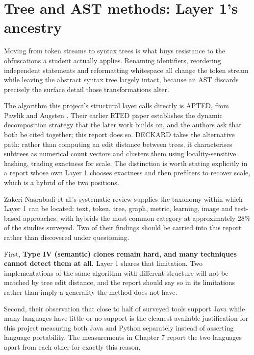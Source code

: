\hypertarget{tree-and-ast-methods-layer-1s-ancestry}{%
\section{Tree and AST methods: Layer 1's
ancestry}\label{tree-and-ast-methods-layer-1s-ancestry}}

Moving from token streams to syntax trees is what buys resistance to the
obfuscations a student actually applies. Renaming identifiers,
reordering independent statements and reformatting whitespace all change
the token stream while leaving the abstract syntax tree largely intact,
because an AST discards precisely the surface detail those
transformations alter.

The algorithm this project's structural layer calls directly is APTED,
from Pawlik and Augsten \cite{pawlik2016}. Their earlier RTED paper
\cite{pawlik2015} establishes the dynamic decomposition strategy that
the later work builds on, and the authors ask that both be cited
together; this report does so. DECKARD \cite{jiang2007} takes the
alternative path: rather than computing an edit distance between trees,
it characterises subtrees as numerical count vectors and clusters them
using locality-sensitive hashing, trading exactness for scale. The
distinction is worth stating explicitly in a report whose own Layer 1
chooses exactness and then prefilters to recover scale, which is a
hybrid of the two positions.

Zakeri-Nasrabadi et al.'s systematic review \cite{zakeri2023} supplies
the taxonomy within which Layer 1 can be located: text, token, tree,
graph, metric, learning, image and test-based approaches, with hybrids
the most common category at approximately 28\% of the studies surveyed.
Two of their findings should be carried into this report rather than
discovered under questioning.

First, \textbf{Type IV (semantic) clones remain hard, and many
techniques cannot detect them at all.} Layer 1 shares that limitation.
Two implementations of the same algorithm with different structure will
not be matched by tree edit distance, and the report should say so in
its limitations rather than imply a generality the method does not have.

Second, their observation that close to half of surveyed tools support
Java while many languages have little or no support is the cleanest
available justification for this project measuring both Java and Python
separately instead of asserting language portability. The measurements
in Chapter 7 report the two languages apart from each other for exactly
this reason.

